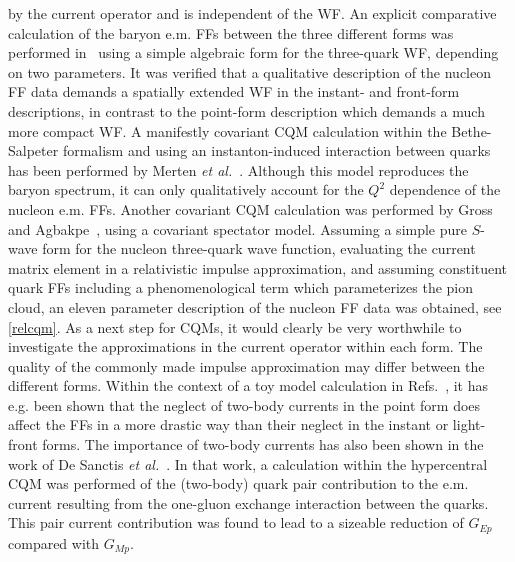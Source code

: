 by the current operator and is independent of the WF. 
An explicit comparative calculation of the baryon e.m. FFs 
between the three different forms was performed in~\cite{Julia-Diaz:2003gq} 
using a simple algebraic form 
for the three-quark WF, depending on two parameters. 
It was verified that a qualitative description of the nucleon FF data 
demands a spatially extended WF in the 
instant- and front-form descriptions, in contrast to 
the point-form description which demands a much more compact WF.  
\newline
\indent
A manifestly covariant CQM calculation within the Bethe-Salpeter formalism 
and using an instanton-induced interaction between quarks has been performed 
by Merten {\it et al.}~\cite{Merten:2002nz}. Although this model 
reproduces the baryon spectrum, it can only qualitatively 
account for the $Q^2$ dependence of the nucleon e.m. FFs. 
\newline
\indent
Another covariant CQM calculation was performed by 
Gross and Agbakpe~\cite{gross}, using a covariant spectator model. 
Assuming a simple pure $S$-wave form for the nucleon three-quark wave 
function, evaluating the current matrix element in 
a relativistic impulse approximation, and assuming constituent quark FFs 
including a phenomenological term which parameterizes the pion cloud, 
an eleven parameter description of the nucleon FF data was obtained, 
see \ref{relcqm}. 
\newline
\indent
As a next step for CQMs, it would clearly be very worthwhile to investigate 
the approximations in the current operator within each form.
The quality of the commonly made impulse approximation 
may differ between the different forms. 
Within the context of a toy model calculation in 
Refs.~\cite{Desplanques:2003nk,Desplanques:2005vu}, 
it has e.g. been shown that the neglect of two-body currents in the point form 
does affect the FFs in a more drastic way than their neglect in the instant 
or light-front forms. 
\newline
\indent
The importance of two-body currents has also been 
shown in the work of De Sanctis {\it et al.}~\cite{Desanctis}. 
In that work, a calculation 
within the hypercentral CQM was performed of the (two-body) quark pair 
contribution to the e.m. current resulting from the 
one-gluon exchange interaction between the quarks. This pair current 
contribution was found to lead to a sizeable reduction of $G_{Ep}$ 
compared with $G_{Mp}$.  



